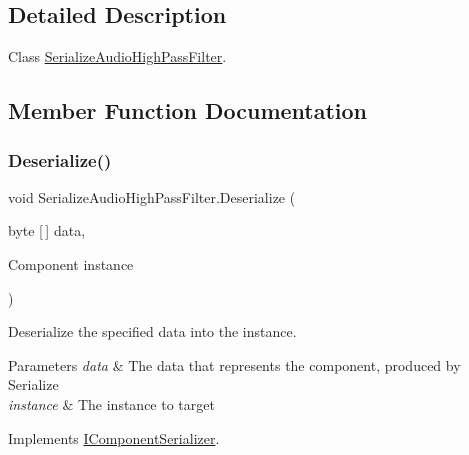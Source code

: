 \subsection{Detailed Description}
Class \hyperlink{class_serialize_audio_high_pass_filter}{Serialize\+Audio\+High\+Pass\+Filter}. 



\subsection{Member Function Documentation}
\mbox{\label{class_serialize_audio_high_pass_filter_a12318bb13445fae737731dc3e1d7172b}} 
\subsubsection{\texorpdfstring{Deserialize()}{Deserialize()}}
{\footnotesize\ttfamily void Serialize\+Audio\+High\+Pass\+Filter.\+Deserialize (\begin{DoxyParamCaption}\item[{byte \mbox{[}$\,$\mbox{]}}]{data,  }\item[{Component}]{instance }\end{DoxyParamCaption})\hspace{0.3cm}{\ttfamily [inline]}}



Deserialize the specified data into the instance. 


\begin{DoxyParams}{Parameters}
{\em data} & The data that represents the component, produced by Serialize\\
\hline
{\em instance} & The instance to target\\
\hline
\end{DoxyParams}


Implements \hyperlink{interface_i_component_serializer_a4cc366a5c78b33d47a90c209d8fed883}{I\+Component\+Serializer}.

\mbox{\label{class_serialize_audio_high_pass_filter_ae26f6c970a4912689ae3a7300fdc9139}} 
